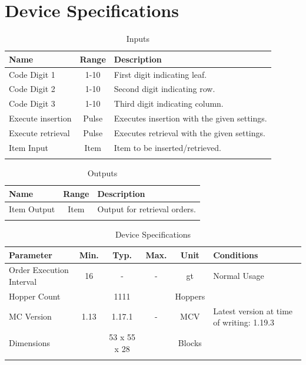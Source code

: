 \documentclass[10pt]{datasheet}
\begin{document}
\onecolumn
\section{Device Specifications}

\begin{table}[h]
    \caption{Inputs}
    \begin{tabularx}{\textwidth}{l | c | X}
        \thickhline
        \textbf{Name} & \textbf{Range} & \textbf{Description} \\
        \hline
        Code Digit 1 & 1-10 & First digit indicating leaf. \\
        Code Digit 2 & 1-10 & Second digit indicating row. \\
        Code Digit 3 & 1-10 & Third digit indicating column. \\
        \hline
        Execute insertion & Pulse & Executes insertion with the given settings. \\
        \hline
        Execute retrieval & Pulse & Executes retrieval with the given settings. \\
        \hline
        Item Input & Item & Item to be inserted/retrieved. \\
        \thickhline
\end{tabularx}
\end{table}

\begin{table}[h]
    \caption{Outputs}
    \begin{tabularx}{\textwidth}{l | c | X}
        \thickhline
        \textbf{Name} & \textbf{Range} & \textbf{Description} \\
        \hline
        Item Output & Item & Output for retrieval orders. \\
        \thickhline
\end{tabularx}
\end{table}

\begin{table}[h]
    \caption{Device Specifications}
    \begin{tabularx}{\textwidth}{l | c c c | c | X}
        \thickhline
        \textbf{Parameter} & \textbf{Min.} & \textbf{Typ.} & \textbf{Max.} &
        \textbf{Unit} & \textbf{Conditions} \\
        \hline
        Order Execution Interval & 16 & - & - & gt & Normal Usage\\
        \hline
        Hopper Count & & 1111 & & Hoppers & \\
        \hline
        MC Version & 1.13 & 1.17.1 & - & MCV & Latest version at time of writing: 1.19.3\\
        \hline
        Dimensions & & 53 x 55 x 28 & & Blocks & \\
        \thickhline
\end{tabularx}
\end{table}
\newpage
\end{document}
